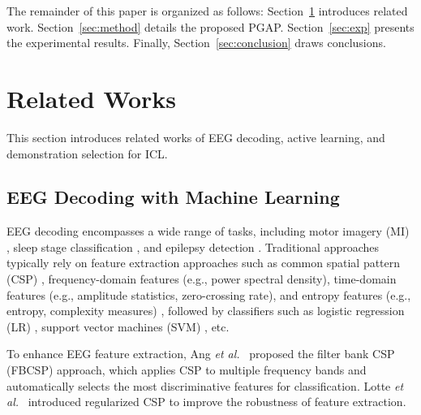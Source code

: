 \documentclass[journal,twocolumn]{IEEEtran}
\begin{document}
The remainder of this paper is organized as follows: Section~\ref{sec:related} introduces related work. Section~\ref{sec:method} details the proposed PGAP. Section~\ref{sec:exp} presents the experimental results. Finally, Section~\ref{sec:conclusion} draws conclusions.


\section{Related Works}
\label{sec:related}

This section introduces related works of EEG decoding, active learning, and demonstration selection for ICL.
 
\subsection{EEG Decoding with Machine Learning}
EEG decoding encompasses a wide range of tasks, including motor imagery (MI) \cite{decety1996neurophysiological, liu2025spatial}, sleep stage classification \cite{aboalayon2016sleep}, and epilepsy detection \cite{wang2023tasa}. Traditional approaches typically rely on feature extraction approaches such as common spatial pattern (CSP) \cite{Ramoser2000}, frequency-domain features (e.g., power spectral density), time-domain features (e.g., amplitude statistics, zero-crossing rate), and entropy features (e.g., entropy, complexity measures) \cite{hassan2017automated}, followed by classifiers such as logistic regression (LR) \cite{cox1958regression}, support vector machines (SVM) \cite{cortes1995support}, etc.

To enhance EEG feature extraction, Ang \textit{et al.}~\cite{4634130} proposed the filter bank CSP (FBCSP) approach, which applies CSP to multiple frequency bands and automatically selects the most discriminative features for classification. Lotte \textit{et al.}~\cite{lotte2010regularizing} introduced regularized CSP to improve the robustness of feature extraction.
\end{document}
